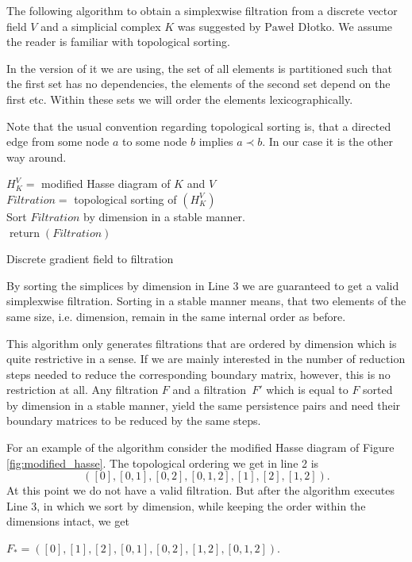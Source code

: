 The following algorithm to obtain a simplexwise filtration from a discrete vector field $V$ and a simplicial complex $K$ was suggested by $\text{Pawe\l}$ $\text{D\l otko}$. We assume the reader is familiar with topological sorting. 

In the version of it we are using, the set of all elements is partitioned such that the first set has no dependencies, the elements of the second set depend on the first etc. Within these sets we will order the elements lexicographically. 

Note that the usual convention regarding topological sorting is, that a directed edge from some node $a$ to some node $b$ implies $a \prec b$. In our case it is the other way around. 


\begin{algorithm}[H]

$H_K^V =$ modified Hasse diagram of $K$ and $V$\\
$Filtration = $ topological sorting of $(H_K^V)$\\
Sort $Filtration$ by dimension in a stable manner.\\
$\operatorname{return}(Filtration)$
\caption{Discrete gradient field to filtration}
\label{algo:dmf_to_filtration}
\end{algorithm} 
\vspace{0.5cm}

By sorting the simplices by dimension in Line 3 we are guaranteed to get a valid simplexwise filtration. Sorting in a stable manner means, that two elements of the same size, i.e. dimension, remain in the same internal order as before. 

This algorithm only generates filtrations that are ordered by dimension which is quite restrictive in a sense. If we are mainly interested in the number of reduction steps needed to reduce the corresponding boundary matrix, however, this is no restriction at all. Any filtration $F$ and a filtration~$F'$ which is equal to $F$ sorted by dimension in a stable manner, yield the same persistence pairs and need their boundary matrices to be reduced by the same steps. 


For an example of the algorithm consider the modified Hasse diagram of Figure \ref{fig:modified_hasse}. The topological ordering we get in line 2 is
\[
     ([0], [0,1], [0,2], [0,1,2], [1], [2], [1,2]).
\]
At this point we do not have a valid filtration. But after the algorithm executes Line 3, in which we sort by dimension, while keeping the order within the dimensions intact, we get 
\begin{center}
$F_* = ([0],[1],[2],[0,1],[0,2],[1,2],[0,1,2])$.
\end{center} 

